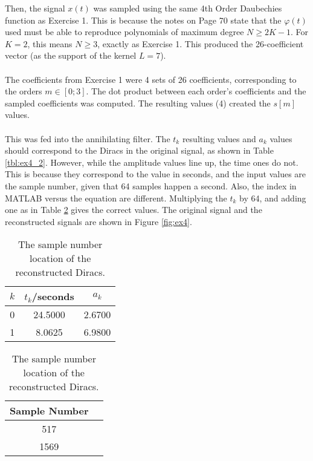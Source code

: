 \documentclass[11pt,a4paper]{report}
\begin{document}
Then, the signal $x(t)$ was sampled using the same 4th Order Daubechies function as Exercise 1. This is because the notes \cite{notes} on Page 70 state that the $\varphi(t)$ used must be able to reproduce polynomials of maximum degree $N \geq 2K -1$. For $K=2$, this means $N \geq 3$, exactly as Exercise 1. This produced the 26-coefficient vector (as the support of the kernel $L = 7$).
\\\\
The coefficients from Exercise 1 were 4 sets of 26 coefficients, corresponding to the orders $m \in [0;3]$. The dot product between each order's coefficients and the sampled coefficients was computed. The resulting values (4) created the $s[m]$ values.
\\\\
This was fed into the annihilating filter. The $t_k$ resulting values and $a_k$ values should correspond to the Diracs in the original signal, as shown in Table \ref{tbl:ex4_2}. However, while the amplitude values line up, the time ones do not. This is because they correspond to the value in seconds, and the input values are the sample number, given that 64 samples happen a second. Also, the index in MATLAB versus the equation are different. Multiplying the $t_k$ by 64, and adding one as in Table \ref{tbl:ex4_3} gives the correct values. The original signal and the reconstructed signals are shown in Figure \ref{fig:ex4}.

\begin{table}[!ht]
    \parbox{.45\linewidth}{
    \centering
    \begin{tabular}{|c|c|c|}
        \hline
        $k$     & $t_k$/seconds     & $a_k$ \\ \hline
        0       & 24.5000   & 2.6700\\ \hline
        1       & 8.0625   & 6.9800\\ \hline
    \end{tabular}
    \caption{Results of the annihilating filter: location and amplitude of Diracs.}
    \label{tbl:ex4_2}
    }
    \hfill
    \parbox{.45\linewidth}{
    \centering
    \begin{tabular}{|c|c|}
        \hline
        \textbf{Sample Number} \\ \hline
        517   \\ \hline
        1569  \\ \hline
    \end{tabular}
    \caption{The sample number location of the reconstructed Diracs.}
    \label{tbl:ex4_3}
    }
\end{table}
\end{document}

